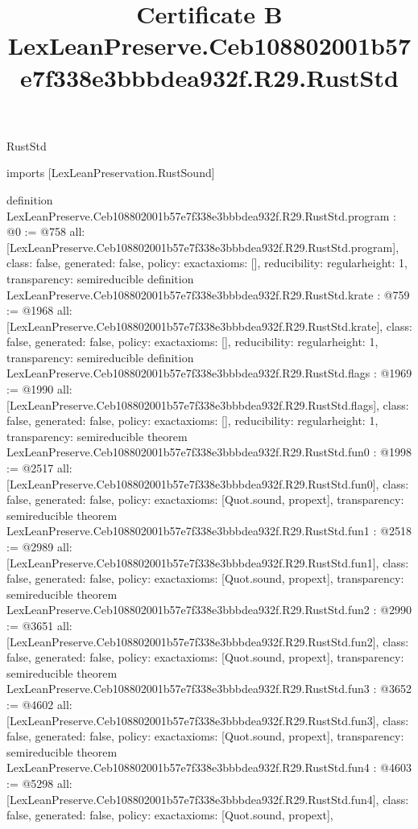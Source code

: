 \begin{lexlean}{RustStd}
\title{Certificate B LexLeanPreserve.Ceb108802001b57e7f338e3bbbdea932f.R29.RustStd}
\begin{coremodule}
imports [LexLeanPreservation.RustSound]

definition LexLeanPreserve.Ceb108802001b57e7f338e3bbbdea932f.R29.RustStd.program : @0 := @758 {
  all: [LexLeanPreserve.Ceb108802001b57e7f338e3bbbdea932f.R29.RustStd.program],
  class: false,
  generated: false,
  policy: exact{axioms: []},
  reducibility: regular{height: 1},
  transparency: semireducible
}
definition LexLeanPreserve.Ceb108802001b57e7f338e3bbbdea932f.R29.RustStd.krate : @759 := @1968 {
  all: [LexLeanPreserve.Ceb108802001b57e7f338e3bbbdea932f.R29.RustStd.krate],
  class: false,
  generated: false,
  policy: exact{axioms: []},
  reducibility: regular{height: 1},
  transparency: semireducible
}
definition LexLeanPreserve.Ceb108802001b57e7f338e3bbbdea932f.R29.RustStd.flags : @1969 := @1990 {
  all: [LexLeanPreserve.Ceb108802001b57e7f338e3bbbdea932f.R29.RustStd.flags],
  class: false,
  generated: false,
  policy: exact{axioms: []},
  reducibility: regular{height: 1},
  transparency: semireducible
}
theorem LexLeanPreserve.Ceb108802001b57e7f338e3bbbdea932f.R29.RustStd.fun0 : @1998 := @2517 {
  all: [LexLeanPreserve.Ceb108802001b57e7f338e3bbbdea932f.R29.RustStd.fun0],
  class: false,
  generated: false,
  policy: exact{axioms: [Quot.sound, propext]},
  transparency: semireducible
}
theorem LexLeanPreserve.Ceb108802001b57e7f338e3bbbdea932f.R29.RustStd.fun1 : @2518 := @2989 {
  all: [LexLeanPreserve.Ceb108802001b57e7f338e3bbbdea932f.R29.RustStd.fun1],
  class: false,
  generated: false,
  policy: exact{axioms: [Quot.sound, propext]},
  transparency: semireducible
}
theorem LexLeanPreserve.Ceb108802001b57e7f338e3bbbdea932f.R29.RustStd.fun2 : @2990 := @3651 {
  all: [LexLeanPreserve.Ceb108802001b57e7f338e3bbbdea932f.R29.RustStd.fun2],
  class: false,
  generated: false,
  policy: exact{axioms: [Quot.sound, propext]},
  transparency: semireducible
}
theorem LexLeanPreserve.Ceb108802001b57e7f338e3bbbdea932f.R29.RustStd.fun3 : @3652 := @4602 {
  all: [LexLeanPreserve.Ceb108802001b57e7f338e3bbbdea932f.R29.RustStd.fun3],
  class: false,
  generated: false,
  policy: exact{axioms: [Quot.sound, propext]},
  transparency: semireducible
}
theorem LexLeanPreserve.Ceb108802001b57e7f338e3bbbdea932f.R29.RustStd.fun4 : @4603 := @5298 {
  all: [LexLeanPreserve.Ceb108802001b57e7f338e3bbbdea932f.R29.RustStd.fun4],
  class: false,
  generated: false,
  policy: exact{axioms: [Quot.sound, propext]},
}
\end{coremodule}
\end{lexlean}

